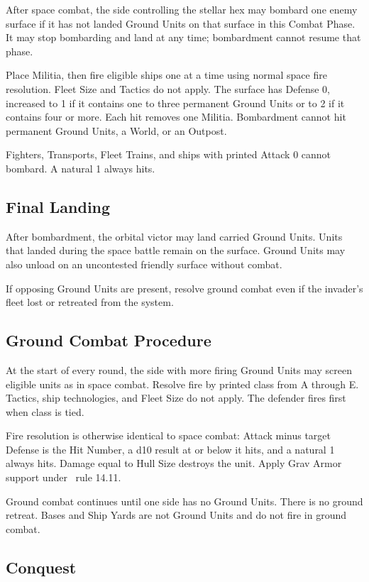 After space combat, the side controlling the stellar hex may bombard one enemy
surface if it has not landed Ground Units on that surface in this Combat Phase.
It may stop bombarding and land at any time; bombardment cannot resume that
phase.

Place Militia, then fire eligible ships one at a time using normal space fire
resolution. Fleet Size and Tactics do not apply. The surface has Defense 0,
increased to 1 if it contains one to three permanent Ground Units or to 2 if it
contains four or more. Each hit removes one Militia. Bombardment cannot hit
permanent Ground Units, a World, or an Outpost.

Fighters, Transports, Fleet Trains, and ships with printed Attack 0 cannot
bombard. A natural 1 always hits.

\subsection{Final Landing}

After bombardment, the orbital victor may land carried Ground Units. Units
that landed during the space battle remain on the surface. Ground Units may
also unload on an uncontested friendly surface without combat.

If opposing Ground Units are present, resolve ground combat even if the
invader's fleet lost or retreated from the system.

\subsection{Ground Combat Procedure}

At the start of every round, the side with more firing Ground Units may screen
eligible units as in space combat. Resolve fire by printed class from A through
E. Tactics, ship technologies, and Fleet Size do not apply. The defender fires
first when class is tied.

Fire resolution is otherwise identical to space combat: Attack minus target
Defense is the Hit Number, a d10 result at or below it hits, and a natural 1
always hits. Damage equal to Hull Size destroys the unit. Apply Grav Armor
support under \CloseEncounters\ rule 14.11.

Ground combat continues until one side has no Ground Units. There is no ground
retreat. Bases and Ship Yards are not Ground Units and do not fire in ground
combat.

\subsection{Conquest}


